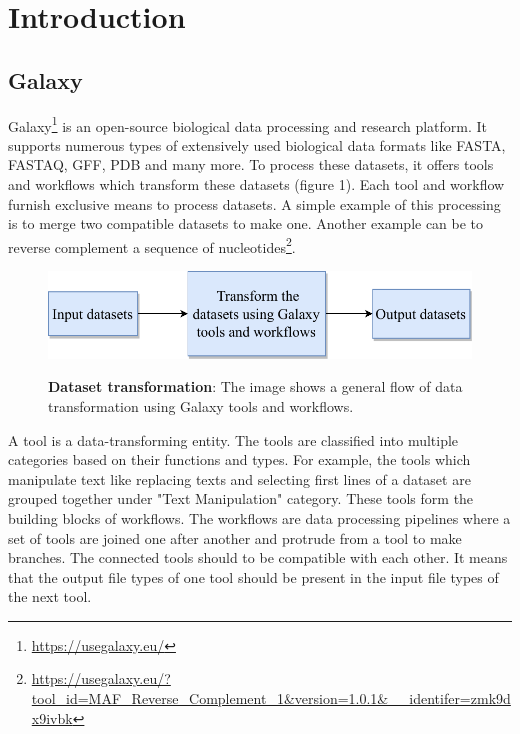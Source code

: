 \chapter{Introduction}\label{chap:introduction}
\section{Galaxy}
Galaxy{\footnote{\url{https://usegalaxy.eu/}}} is an open-source biological data processing and research platform. It supports numerous types of extensively used biological data formats like FASTA, FASTAQ, GFF, PDB and many more. To process these datasets, it offers tools and workflows which transform these datasets (figure 1). Each tool and workflow furnish exclusive means to process datasets. A simple example of this processing is to merge two compatible datasets to make one. Another example can be to reverse complement a sequence of 
nucleotides\footnote{\url{https://usegalaxy.eu/?tool_id=MAF_Reverse_Complement_1&version=1.0.1&__identifer=zmk9dx9ivbk}}.

\begin{figure}[h]
\begin{centering}
    {\includegraphics[scale=0.8]{figures/image_Galaxy_1.pdf}}
    \caption[Basic flow of dataset transformation]{\textbf{Dataset transformation}: The image shows a general flow of data transformation using Galaxy tools and workflows.}
\end{centering}
\end{figure}

A tool is a data-transforming entity. The tools are classified into multiple categories based on their functions and types. For example, the tools which manipulate text like replacing texts and selecting first lines of a dataset are grouped together under "Text Manipulation" category. These tools form the building blocks of workflows. The workflows are data processing pipelines where a set of tools are joined one after another and protrude from a tool to make branches. The connected tools should to be compatible with each other. It means that the output file types of one tool should be present in the input file types of the next tool.

